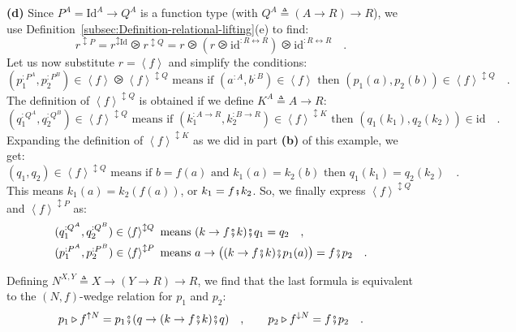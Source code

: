 \textbf{(d)} Since $P^{A}=\text{Id}^{A}\rightarrow Q^{A}$ is a function
type (with $Q^{A}\triangleq\left(A\rightarrow R\right)\rightarrow R$),
we use Definition~\ref{subsec:Definition-relational-lifting}(e)
to find: 
\[
r^{\updownarrow P}=r^{\updownarrow\text{Id}}\ogreaterthan r^{\updownarrow Q}=r\ogreaterthan(r\ogreaterthan\text{id}^{:R\leftrightarrow R})\ogreaterthan\text{id}^{:R\leftrightarrow R}\quad.
\]
Let us now substitute $r=\left<f\right>$ and simplify the conditions:
\[
(p_{1}^{:P^{A}},p_{2}^{:P^{B}})\in\left<f\right>\ogreaterthan\left<f\right>^{\updownarrow Q}\text{ means if }(a^{:A},b^{:B})\in\left<f\right>\text{ then }(p_{1}(a),p_{2}(b))\in\left<f\right>^{\updownarrow Q}\quad.
\]
The definition of $\left<f\right>^{\updownarrow Q}$ is obtained if
we define $K^{A}\triangleq A\rightarrow R$:
\[
(q_{1}^{:Q^{A}},q_{2}^{:Q^{B}})\in\left<f\right>^{\updownarrow Q}\text{ means if }(k_{1}^{:A\rightarrow R},k_{2}^{:B\rightarrow R})\in\left<f\right>^{\updownarrow K}\text{ then }(q_{1}(k_{1}),q_{2}(k_{2}))\in\text{id}\quad.
\]
Expanding the definition of $\left<f\right>^{\updownarrow K}$ as
we did in part \textbf{(b)} of this example, we get:
\[
(q_{1},q_{2})\in\left<f\right>^{\updownarrow Q}\text{ means if }b=f(a)\text{ and }k_{1}(a)=k_{2}(b)\text{ then }q_{1}(k_{1})=q_{2}(k_{2})\quad.
\]
This means $k_{1}(a)=k_{2}(f(a))$, or $k_{1}=f\bef k_{2}$. So, we
finally express $\left<f\right>^{\updownarrow Q}$ and $\left<f\right>^{\updownarrow P}$
as:
\begin{align*}
 & (q_{1}^{:Q^{A}},q_{2}^{:Q^{B}})\in\left<f\right>^{\updownarrow Q}\text{ means }(k\rightarrow f\bef k)\bef q_{1}=q_{2}\quad,\\
 & (p_{1}^{:P^{A}},p_{2}^{:P^{B}})\in\left<f\right>^{\updownarrow P}\text{ means }a\rightarrow\big((k\rightarrow f\bef k)\bef p_{1}(a)\big)=f\bef p_{2}\quad.
\end{align*}

Defining $N^{X,Y}\triangleq X\rightarrow\left(Y\rightarrow R\right)\rightarrow R$,
we find that the last formula is equivalent to the $\left(N,f\right)$-wedge
relation for $p_{1}$ and $p_{2}$:
\[
p_{1}\triangleright f^{\uparrow N}=p_{1}\bef(q\rightarrow(k\rightarrow f\bef k)\bef q)\quad,\quad\quad p_{2}\triangleright f^{\downarrow N}=f\bef p_{2}\quad.
\]

